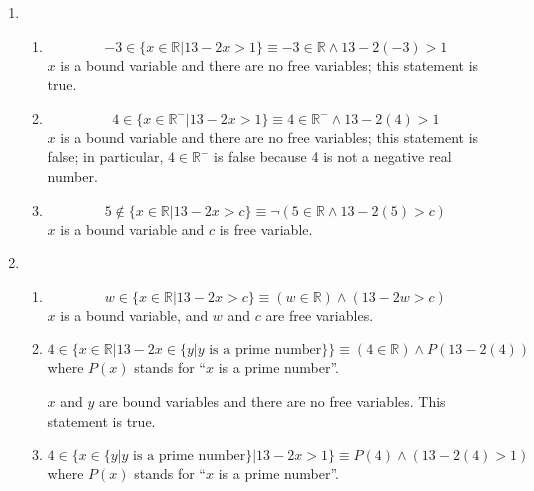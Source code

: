 \documentclass{article}
\begin{document}
\begin{enumerate}
\begin{enumerate}
  \end{enumerate}
\item
  \begin{enumerate}
  \item
    \begin{equation*}
      -3 \in \{x \in \mathbb{R} | 13 - 2x > 1\} \equiv -3 \in \mathbb{R} \land 13 - 2(-3) > 1
    \end{equation*}
    $x$ is a bound variable and there are no free variables; this statement is true.
  \item
    \begin{equation*}
      4 \in \{x \in \mathbb{R}^{-} | 13 - 2x > 1\} \equiv 4 \in \mathbb{R}^{-} \land 13 - 2(4) > 1
    \end{equation*}
    $x$ is a bound variable and there are no free variables; this statement is false; in particular, $4 \in \mathbb{R}^{-}$ is false because 4 is not a negative real number.
    \item
  \begin{equation*}
    5 \notin \{x \in \mathbb{R} | 13 - 2x > c\} \equiv \lnot(5 \in \mathbb{R} \land 13 - 2(5) > c)
  \end{equation*}
  $x$ is a bound variable and $c$ is free variable.
  \end{enumerate}
\item
  \begin{enumerate}
  \item
    \begin{equation*}
      w \in \{x \in \mathbb{R} | 13 - 2x > c\} \equiv (w \in \mathbb{R}) \land (13 -2w > c)
    \end{equation*}
    $x$ is a bound variable, and $w$ and $c$ are free variables.
  \item
    \begin{equation*}
      4 \in \{x \in \mathbb{R} | 13 - 2x \in \{ y | y \text{ is a prime number}\} \} \equiv (4 \in \mathbb{R}) \land P(13 - 2(4))
    \end{equation*}
    where $P(x)$ stands for ``$x$ is a prime number''.

    $x$ and $y$ are bound variables and there are no free variables.  This statement is true.
  \item
    \begin{equation*}
      4 \in \{x \in \{y | y \text{ is a prime number}\} | 13 -2x > 1\} \equiv P(4) \land (13 - 2(4) > 1)
    \end{equation*}
    where $P(x)$ stands for ``$x$ is a prime number''.


\end{enumerate}
\end{enumerate}
\end{document}
